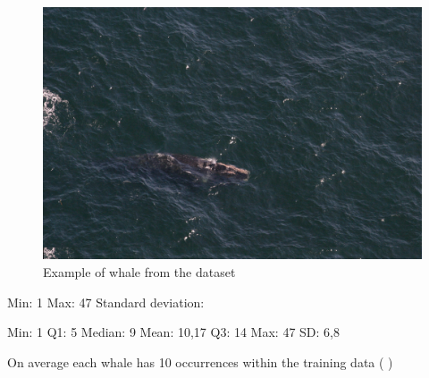 \begin{figure}
	\centering
	\includegraphics[width=\linewidth]{Images/w_7489.jpg}
	\caption{Example of whale from the dataset}
	\label{fig:whale-example}
\end{figure}

Min: 1
Max: 47
Standard deviation: 

Min: 1
Q1: 5
Median: 9
Mean: 10,17
Q3: 14
Max: 47
SD: 6,8

On average each whale has 10 occurrences within the training data ( )